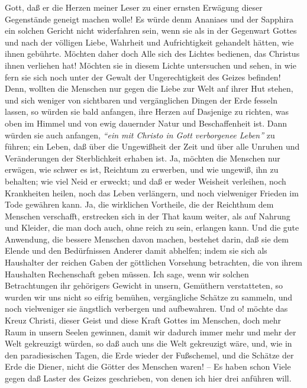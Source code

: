 Gott, daß er die Herzen meiner Leser zu einer ernsten Erwägung dieser
Gegenstände geneigt machen wolle! Es würde denm Ananiaes und der Sapphira ein
solchen Gericht nicht widerfahren sein, wenn sie als in der Gegenwart Gottes und
nach der völligen Liebe, Wahrheit und Aufrichtigkeit gehandelt hätten, wie ihnen
gebührte. Möchten daher doch Alle sich des Lichtes bedienen, das Christus ihnen
verliehen hat! Möchten sie in diesem Lichte untersuchen und sehen, in wie fern
sie sich noch unter der Gewalt der Ungerechtigkeit des Geizes befinden! Denn,
wollten die Menschen nur gegen die Liebe zur Welt anf ihrer Hut stehen, und sich
weniger von sichtbaren und vergänglichen Dingen der Erde fesseln lassen, so
würden sie bald anfangen, ihre Herzen auf Dasjenige zu richten, was oben im
Himmel und von ewig dauernder Natur und Beschaffenheit ist. Dann würden sie auch
anfangen, \textit{"`ein mit Christo in Gott verborgenee Leben"'} zu führen; ein Leben,
daß über die Ungewißheit der Zeit und über alle Unruhen und Veränderungen der
Sterblichkeit erhaben ist. Ja, möchten die Menschen nur erwägen, wie schwer es
ist, Reichtum zu erwerben, und wie ungewiß, ihn zu behalten; wie viel Neid er
erweckt; und daß er weder Weisheit verleihen, noch Krankheiten heilen, noch das
Leben verlängern, und noch vielweniger Frieden im Tode gewähren kann. Ja, die
wirklichen Vortheile, die der Reichthum dem Menschen verschafft, erstrecken sich
in der That kaum weiter, als auf Nahrung und Kleider, die man doch auch, ohne
reich zu sein, erlangen kann. Und die gute Anwendung, die bessere Menschen davon
machen, bestehet darin, daß sie dem Elende und den Bedürfnissen Anderer damit
abhelfen; indem sie sich als Haushalter der reichen Gaben der göttlichen
Vorsehung betrachten, die von ihrem Haushalten Rechenschaft geben müssen. Ich
sage, wenn wir solchen Betrachtungen ihr gehörigers Gewicht in unsern, Gemüthern
verstatteten, so wurden wir uns nicht so eifrig bemühen, vergängliche Schätze zu
sammeln, und noch vielweniger sie ängstlich verbergen und aufbewahren. Und o!
möchte das Kreuz Christi, dieser Geist und diese Kraft Gottes im Menschen, doch
mehr Raum in unsern Seelen gewinnen, damit wir dadurch immer mehr und mehr der
Welt gekreuzigt würden, so daß auch uns die Welt gekreuzigt wäre, und, wie in
den paradiesischen Tagen, die Erde wieder der Fußschemel, und die Schätze der
Erde die Diener, nicht die Götter des Menschen waren! -- Es haben schon Viele
gegen daß Laster des Geizes geschrieben, von denen ich hier drei anführen will.

